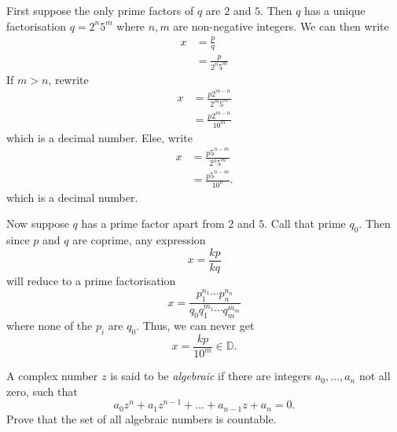 \documentclass[12 pt, letterpaper]{hmcpset}
\begin{document}
\begin{solution}
	First suppose the only prime factors of $q$ are $2$ and $5$. Then $q$ has a unique factorisation $q = 2^{n} 5^{m}$ where $n, m$ are non-negative integers. We can then write
	\[
		\begin{split}
			x & = \frac{p}{q} \\
			  & = \frac{p}{2^{n} 5^{m}}
		\end{split}
	\]
	If $m > n$, rewrite
	 \[
		\begin{split}
			x & = \frac{p 2^{m - n}}{2^{m} 5^{m}} \\
			  & = \frac{p 2^{m - n}}{10^{m}}
		\end{split}
	\]
	which is a decimal number. Else, write
	 \[
		\begin{split}
			x & = \frac{p 5^{n - m}}{2^{n} 5^{m}} \\
			  & = \frac{p 5^{n - m}}{10^{n}}.
		\end{split}
	\]
	which is a decimal number.

	Now suppose $q$ has a prime factor apart from $2$ and $5$. Call that prime $q_{0}$. Then since $p$ and $q$ are coprime, any expression
	\[
		x = \frac{kp}{kq}
	\]
	will reduce to a prime factorisation
	\[
		x = \frac{p_{1}^{n_{1}} \cdots p_{n}^{n_{n}}}{q_{0} q_{1}^{m_{1}} \cdots q_{m}^{m_{m}}}
	\]
	where none of the $p_{i}$ are $q_{0}$. Thus, we can never get
	\[
		x = \frac{kp}{10^{m}} \in \mathbb{D}.
	\]
\end{solution}

\pagebreak

\begin{problem}
	A complex number $z$ is said to be \textit{algebraic} if there are integers $a_{0}, \dots, a_{n}$ not all zero, such that
	\[
		a_{0} z^{n} + a_{1} z^{n - 1} + \dots + a_{n - 1} z + a_{n} = 0.
	\]
	Prove that the set of all algebraic numbers is countable.	
\end{problem}
\end{document}
